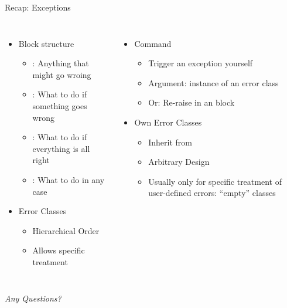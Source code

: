 
\begin{frame}[t,plain]
\titlepage
\end{frame}


\begin{frame}{Recap: Exceptions}
%
\begin{columns}[T]
\begin{itemize}
\item Block structure
	\begin{itemize}
	\item {}: Anything that might go wroing
	\item {}: What to do if something goes wrong
	\item {}: What to do if everything is all right
	\item {}: What to do in any case
	\end{itemize}
\item Error Classes
	\begin{itemize}
	\item Hierarchical Order
	\item Allows specific treatment
	\end{itemize}
\end{itemize}
%
\begin{itemize}
\item Command 
	\begin{itemize}
	\item Trigger an exception yourself
	\item Argument: instance of an error class
	\item Or: Re-raise in an  block
	\end{itemize}
\item Own Error Classes
	\begin{itemize}
	\item Inherit from  
	\item Arbitrary Design
	\item Usually only for specific treatment of user-defined errors: \enquote{empty} classes
	\end{itemize}
\end{itemize}
\end{columns}
%
\begin{center}
	\emph{Any Questions?}
\end{center}
%
\end{frame}

